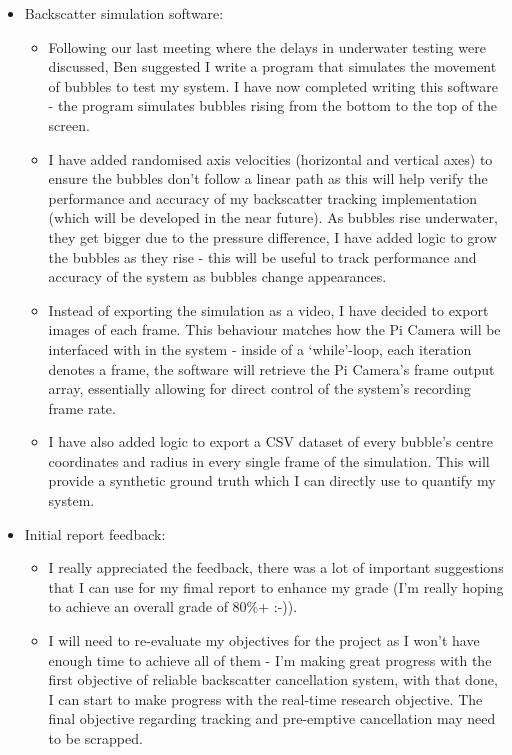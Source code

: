 \begin{itemize}
    \item Backscatter simulation software:
    \begin{itemize}
        \item Following our last meeting where the delays in underwater testing were discussed, Ben suggested I write a program that simulates the movement of bubbles to test my system. I have now completed writing this software - the program simulates bubbles rising from the bottom to the top of the screen.
        \item I have added randomised axis velocities (horizontal and vertical axes) to ensure the bubbles don't follow a linear path as this will help verify the performance and accuracy of my backscatter tracking implementation (which will be developed in the near future). As bubbles rise underwater, they get bigger due to the pressure difference, I have added logic to grow the bubbles as they rise - this will be useful to track performance and accuracy of the system as bubbles change appearances.
        \item Instead of exporting the simulation as a video, I have decided to export images of each frame. This behaviour matches how the Pi Camera will be interfaced with in the system - inside of a `while'-loop, each iteration denotes a frame, the software will retrieve the Pi Camera's frame output array, essentially allowing for direct control of the system's recording frame rate.
        \item I have also added logic to export a CSV dataset of every bubble's centre coordinates and radius in every single frame of the simulation. This will provide a synthetic ground truth which I can directly use to quantify my system.
    \end{itemize}

    \item Initial report feedback:
    \begin{itemize}
        \item I really appreciated the feedback, there was a lot of important suggestions that I can use for my fimal report to enhance my grade (I'm really hoping to achieve an overall grade of 80\%+ :-)).
        \item I will need to re-evaluate my objectives for the project as I won't have enough time to achieve all of them - I'm making great progress with the first objective of reliable backscatter cancellation system, with that done, I can start to make progress with the real-time research objective. The final objective regarding tracking and pre-emptive cancellation may need to be scrapped.
    \end{itemize}
\end{itemize}

